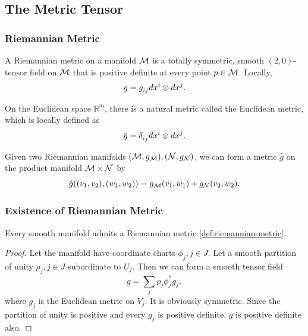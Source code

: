 \documentclass[../main.tex]{subfiles}
\begin{document}
    \subsection{The Metric Tensor}
    \subsubsection{Riemannian Metric}
    \begin{definition}\label{def:riemannian-metric}
        A Riemannian metric on a manifold \(\manifold[M]\) is a totally symmetric, 
        smooth \((2, 0)\)-tensor field on \(\manifold[M]\) that is positive definite 
        at every point \(p \in \manifold[M]\). Locally, 
        \[
        g = g\indices{_i_j}dx^i\otimes dx^j.
        \]
    \end{definition}
    \begin{definition}\label{def:euclidean-metric}
        On the Euclidean space \(\mathbb{R}^m\), there is a natural metric called the 
        Euclidean metric, which is locally defined as 
        \[
        \eucMetric=\delta\indices{_i_j}dx^i\otimes dx^j.
        \]
    \end{definition}
    \begin{definition}\label{def:product-metric}
        Given two Riemannian manifolds \((\manifold[M], g_{\manifold[M]}), 
        (\manifold[N], g_{\manifold[N]})\), we can form a metric \(\hat{g}\) on the 
        product manifold \(\manifold[M]\times\manifold[N]\) by 
        \[
        \hat{g}((v_1, v_2), (w_1, w_2)) = g_{\manifold[M]}(v_1, w_1) + 
        g_{\manifold[N]}(v_2, w_2).
        \]
    \end{definition}
    \subsubsection{Existence of Riemannian Metric}
    \begin{theorem}\label{thm:riemannian-metric-existence}
        Every smooth manifold admits a Riemannian metric \cref{def:riemannian-metric}.
    \end{theorem}
    \begin{proof}
        Let the manifold have coordinate charts \(\phi_j, j \in J\). Let a smooth 
        partition of unity \(\rho_j, j \in J\) subordinate to \(U_j\). Then we can 
        form a smooth tensor field 
        \[
        g = \sum_{j}^{} \rho_j\phi_j^*g_j,
        \]
        where \(g_j\) is the Euclidean metric on \(V_j\). It is obviously symmetric. 
        Since the partition of unity is positive and every \(g_j\) is positive 
        definite, \(g\) is positive definite also.
    \end{proof}
    \newpage
\end{document}
